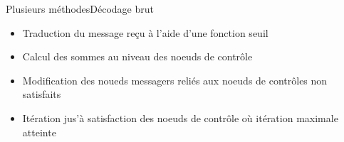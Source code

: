 \documentclass[11pt]{beamer}
\begin{document}
\begin{frame}{Plusieurs m\'ethodes}{D\'ecodage brut}
	\begin{itemize}
		\item Traduction du message re\c{c}u \`a l'aide d'une fonction seuil
		\item Calcul des sommes au niveau des noeuds de contr\^ole
		\item Modification des noueds messagers reli\'es aux noeuds de contrôles non satisfaits
		\item It\'eration jus'\`a satisfaction des noeuds de contr\^ole o\`u it\'eration maximale atteinte
	\end{itemize}
\end{frame}
\end{document}
